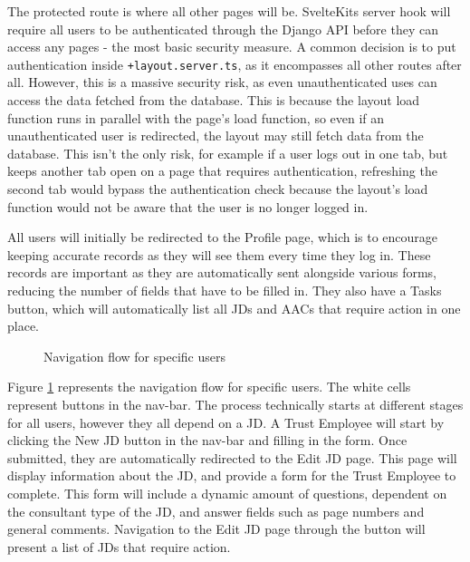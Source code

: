 The protected route is where all other pages will be. SvelteKits server hook will require all users to be authenticated through the Django API before they can access any pages - the most basic security measure. A common decision is to put authentication inside \texttt{+layout.server.ts}, as it encompasses all other routes after all. However, this is a massive security risk, as even unauthenticated uses can access the data fetched from the database. This is because the layout load function runs in parallel with the page's load function, so even if an unauthenticated user is redirected, the layout may still fetch data from the database. This isn't the only risk, for example if a user logs out in one tab, but keeps another tab open on a page that requires authentication, refreshing the second tab would bypass the authentication check because the layout's load function would not be aware that the user is no longer logged in.

All users will initially be redirected to the Profile page, which is to encourage keeping accurate records as they will see them every time they log in. These records are important as they are automatically sent alongside various forms, reducing the number of fields that have to be filled in. They also have a Tasks button, which will automatically list all JDs and AACs that require action in one place.

\begin{figure}[h]
\centering
{}
\vspace{-5pt}
\caption{Navigation flow for specific users}
\label{fig:ui-role}
\vspace{-5pt}
\end{figure}

Figure \ref{fig:ui-role} represents the navigation flow for specific users. The white cells represent buttons in the nav-bar. The process technically starts at different stages for all users, however they all depend on a JD. A Trust Employee will start by clicking the New JD button in the nav-bar and filling in the form. Once submitted, they are automatically redirected to the Edit JD page. This page will display information about the JD, and provide a form for the Trust Employee to complete. This form will include a dynamic amount of questions, dependent on the consultant type of the JD, and answer fields such as page numbers and general comments. Navigation to the Edit JD page through the button will present a list of JDs that require action.


